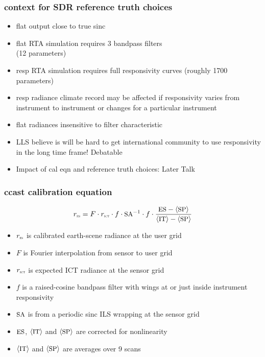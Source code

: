 \documentclass[11pt]{beamer}
\begin{document}
\begin{frame}
\frametitle{context for SDR reference truth choices}

\begin{itemize}

  \item {\ccast} flat output close to true sinc \ils

  \item {\ccast} flat RTA simulation requires 3 bandpass filters \\
    (12 parameters)

  \item {\noaa} resp RTA simulation requires full responsivity curves
    (roughly 1700 parameters)


  \item {\noaa} resp radiance climate record may be affected if
    responsivity varies from instrument to instrument or changes for
    a particular instrument

  \item {\cris} flat radiances insensitive to filter characteristic

  \item LLS believe is will be hard to get international community to
    use responsivity in the long time frame!  Debatable

  \item Impact of cal eqn and reference truth choices: Later Talk

\end{itemize}

\end{frame}
\begin{frame}
\frametitle{ccast calibration equation}

\[r_{\mbox{\tiny\textsc{es}}} = F \cdot r_{\mbox{\tiny\textsc{ict}}} \cdot f \cdot \mbox{\small SA}^{-1}\cdot f \cdot 
         \frac{\mbox{\small ES} - \langle\mbox{\small SP}\rangle}{\langle\mbox{\small IT}\rangle - \langle\mbox{\small SP}\rangle} \]

\begin{itemize}
  \item $r_{\mbox{\tiny\textsc{es}}}$ is calibrated earth-scene radiance at the user grid
  \item $F$ is Fourier interpolation from sensor to user grid
  \item $r_{\mbox{\tiny\textsc{ict}}}$ is expected ICT radiance at the sensor grid
  \item $f$ is a raised-cosine bandpass filter with wings at or just
    inside instrument responsivity
  \item $\mbox{\small SA}$ is from a periodic sinc ILS wrapping at the sensor
    grid
  \item $\mbox{\small ES}$, $\langle\mbox{\small IT}\rangle$ and $\langle\mbox{\small SP}\rangle$ are corrected for
    nonlinearity
  \item $\langle\mbox{\small IT}\rangle$ and $\langle\mbox{\small SP}\rangle$ are averages over 9 scans
\end{itemize}

\end{frame}
\end{document}
